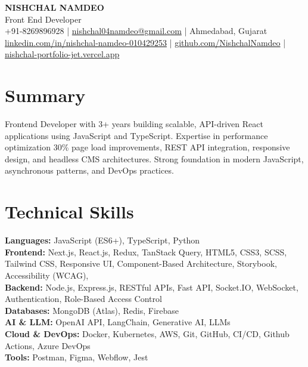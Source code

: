 \documentclass[a4paper,10pt]{article}
\begin{document}
\begin{center}
  {\LARGE \textbf{NISHCHAL NAMDEO}}\\[3pt]
  Front End Developer\\[3pt]
  +91-8269896928 | \href{mailto:nishchal04namdeo@gmail.com}{nishchal04namdeo@gmail.com} | Ahmedabad, Gujarat\\[2pt]
  \href{https://www.linkedin.com/in/nishchal-namdeo-010429253/}{linkedin.com/in/nishchal-namdeo-010429253} |
  \href{https://github.com/NishchalNamdeo}{github.com/NishchalNamdeo} |
  \href{https://nishchal-portfolio-jet.vercel.app/}{nishchal-portfolio-jet.vercel.app}
\end{center}

\section{Summary}
Frontend Developer with 3+ years building scalable, API-driven React applications using JavaScript and TypeScript. Expertise in performance optimization 30\% page load improvements, REST API integration, responsive design, and headless CMS architectures. Strong foundation in modern JavaScript, asynchronous patterns, and DevOps practices.

\section{Technical Skills}
\textbf{Languages:} JavaScript (ES6+), TypeScript, Python\\
\textbf{Frontend:} Next.js, React.js, Redux, TanStack Query, HTML5, CSS3, SCSS, Tailwind CSS, Responsive UI, Component-Based Architecture, Storybook, Accessibility (WCAG),\\
\textbf{Backend:} Node.js, Express.js, RESTful APIs, Fast API, Socket.IO, WebSocket, Authentication, Role-Based Access Control\\
\textbf{Databases:} MongoDB (Atlas), Redis, Firebase\\
\textbf{AI \& LLM:} OpenAI API, LangChain, Generative AI, LLMs\\
\textbf{Cloud \& DevOps:} Docker, Kubernetes, AWS, Git, GitHub, CI/CD, Github Actions, Azure DevOps\\
\textbf{Tools:} Postman, Figma, Webflow, Jest

\end{document}
